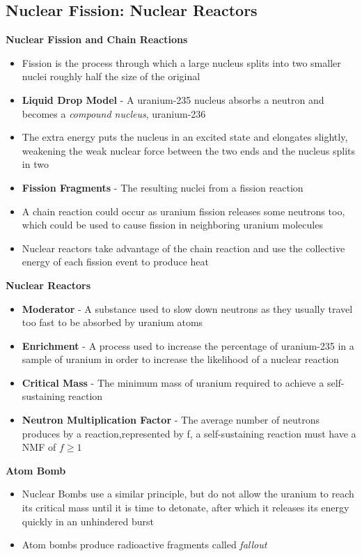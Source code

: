 \subsection{Nuclear Fission: Nuclear Reactors}
\textbf{Nuclear Fission and Chain Reactions}
\begin{itemize}
    \item Fission is the process through which a large nucleus splits into two smaller nuclei roughly half the size of the original
    \item \textbf{Liquid Drop Model} - A uranium-235 nucleus absorbs a neutron and becomes a \emph{compound nucleus}, uranium-236
    \item The extra energy puts the nucleus in an excited state and elongates slightly, weakening the weak nuclear force between the two ends and the nucleus splits in two
    \item \textbf{Fission Fragments} - The resulting nuclei from a fission reaction
    \item A chain reaction could occur as uranium fission releases some neutrons too, which could be used to cause fission in neighboring uranium molecules
    \item Nuclear reactors take advantage of the chain reaction and use the collective energy of each fission event to produce heat
\end{itemize}

\textbf{Nuclear Reactors}
\begin{itemize}
    \item \textbf{Moderator} - A substance used to slow down neutrons as they usually travel too fast to be absorbed by uranium atoms
    \item \textbf{Enrichment} - A process used to increase the percentage of uranium-235 in a sample of uranium in order to increase the likelihood of a nuclear reaction
    \item \textbf{Critical Mass} - The minimum mass of uranium required to achieve a self-sustaining reaction
    \item \textbf{Neutron Multiplication Factor} - The average number of neutrons produces by a reaction,represented by f, a self-sustaining reaction must have a NMF of \(f\geq1\)
\end{itemize}

\textbf{Atom Bomb}
\begin{itemize}
    \item Nuclear Bombs use a similar principle, but do not allow the uranium to reach its critical mass until it is time to detonate, after which it releases its energy quickly in an unhindered burst
    \item Atom bombs produce radioactive fragments called \emph{fallout}
\end{itemize}

